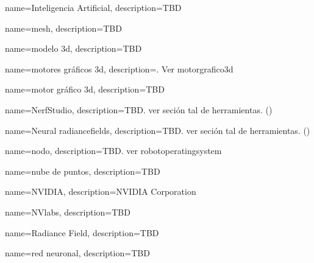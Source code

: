 {
    name={Inteligencia Artificial},
    description={TBD}
}





{
    name={mesh},
    description={TBD}
}

{
    name={modelo \acrshort{3d}},
    description={TBD}
}

{
    name={motores gráficos \acrshort{3d}},
    description={. Ver \gls{motorgrafico3d}}
}

{
    name={motor gráfico \acrshort{3d}},
    description={TBD}
}


{
    name={NerfStudio},
    description={TBD. ver seción tal de herramientas. (\cite{nerfstudio})}
}

{
    name={Neural \glspl{radiancefield}},
    description={TBD. ver seción tal de herramientas. (\cite{mildenhall2020nerf})}
}

{
    name={nodo},
    description={TBD. ver \gls{robotoperatingsystem}}
}

{
    name={nube de puntos},
    description={TBD}
}

{
    name={NVIDIA},
    description={NVIDIA Corporation}
}

{
    name={NVlabs},
    description={TBD}
}





{
    name={Radiance Field},
    description={TBD}
}

{
    name={red neuronal},
    description={TBD}
}

